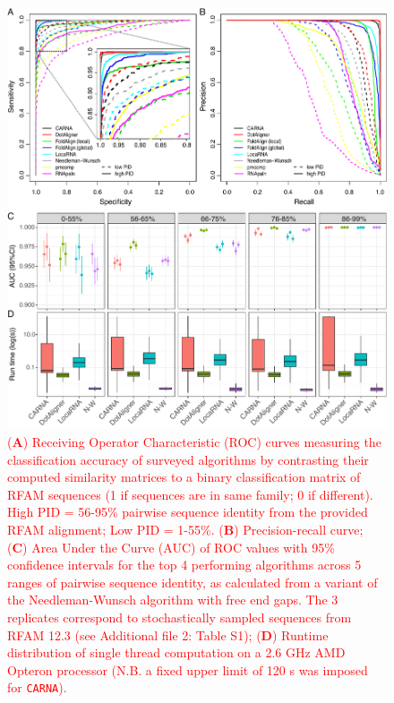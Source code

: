 \documentclass{bmcart}
\newcommand\carna{\texttt{CARNA}}
\begin{document}
\begin{backmatter}
\begin{figure}[h!]
 \includegraphics[width=\textwidth]{Fig3}
 \caption {
  \textcolor{red} {
 (\textbf{A}) Receiving Operator Characteristic (ROC) curves measuring the classification
 accuracy of surveyed algorithms by contrasting their computed similarity matrices 
 to a binary classification matrix of RFAM  sequences (1 if sequences are in same family; 
 0 if different). High PID =  56-95\% pairwise sequence identity from the provided RFAM alignment; Low PID  = 1-55\%.
 (\textbf{B}) Precision-recall curve;  
 (\textbf{C}) Area Under the Curve (AUC) of ROC values with 95\% confidence intervals 
for the top 4 performing algorithms across 5 ranges of pairwise sequence identity, 
 as calculated from a variant of the Needleman-Wunsch algorithm with free end gaps. 
 The 3 replicates correspond to stochastically sampled sequences from RFAM 12.3  (see Additional file 2: Table S1); 
 (\textbf{D}) Runtime distribution of single thread computation on a 2.6 GHz AMD Opteron processor 
 (N.B. a fixed upper limit of 120 s was  imposed for \carna{}). }  }
\end{figure}



\end{backmatter}
\end{document}
